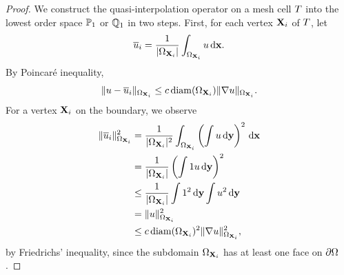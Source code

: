 \begin{proof}
  We construct the quasi-interpolation operator on a mesh cell $\cell$
  into the lowest order space $\P_1$ or $\Q_1$ in two steps. First,
  for each vertex $\vertex_i$ of $\cell$, let
  \begin{gather}
    \overline u_i = \frac1{\abs{\domain_{\vertex_i}}}
    \int_{\domain_{\vertex_i}} u \dvx.
  \end{gather}
  By Poincaré inequality,
  \begin{gather}
    \label{eq:fem-aposteriori:1}
    \norm{u-\overline u_i}_{\domain_{\vertex_i}}
    \le c \diam(\domain_{\vertex_i}) \norm{\nabla u}_{\domain_{\vertex_i}}.
  \end{gather}
  For a vertex $\vertex_i$ on the boundary, we observe
  \begin{gather}
    \label{eq:fem-aposteriori:2}
    \begin{split}
      \norm{\overline u_i}_{\domain_{\vertex_i}}^2
      &= \frac1{\abs{\domain_{\vertex_i}}^2}
      \int_{\domain_{\vertex_i}}\left(\int u \dvy\right)^2\dvx\\
      & = \frac1{\abs{\domain_{\vertex_i}}}\left(\int 1 u \dvy\right)^2\\
      & \le \frac1{\abs{\domain_{\vertex_i}}} \int 1^2\dvy \int u^2\dvy \\
      & = \norm{u}^2_{{\domain_{\vertex_i}}}\\
      & \le c \diam({\domain_{\vertex_i}})^2 \norm{\nabla u}_{{\domain_{\vertex_i}}}^2,
    \end{split}
  \end{gather}
  by Friedrichs' inequality, since the subdomain
  ${\domain_{\vertex_i}}$ has at least one face on $\d\domain$.


\end{proof}
